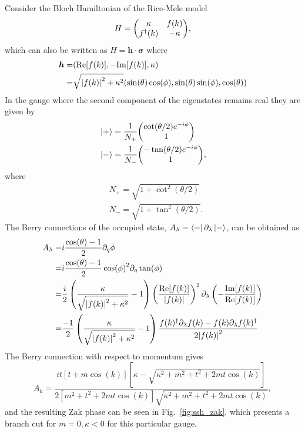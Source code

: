 \documentclass[twocolumn,amsmath,longbibliography,amssymb,superscriptaddress]{revtex4-1}
\begin{document}
Consider the Bloch Hamiltonian of the Rice-Mele model
\begin{equation}
H=\mqty(\kappa & f(k) \\ f^\dagger(k) & -\kappa),
\end{equation}
which can also be written as $H = \boldsymbol{h}\cdot \boldsymbol{\sigma}$
where 
\begin{align*}
\boldsymbol{h}=& ({\rm Re}[f(k)],-{\rm Im}[f(k)],\kappa) \\
=& \sqrt{\abs{f(k)}^2 +\kappa^2}(\sin(\theta)\cos(\phi),\sin(\theta)\sin(\phi),\cos(\theta))
\end{align*}
In the gauge where the second component of the eigenstates remains real they are given by
\begin{align}
&\ket{+}  = \frac{1}{N_+}\mqty(\cot(\theta/2)e^{-i\phi}\\ 1 )\\
&\ket{-}  =\frac{1}{N_-} \mqty(-\tan(\theta/2)e^{-i\phi}\\ 1),
\end{align}
where
\begin{align*}
&N_+ = \sqrt{1+\cot^2(\theta/2)} \\
&N_- = \sqrt{1+\tan^2(\theta/2)} .
\end{align*}
The Berry connections of the occupied state, $A_\lambda = \bra{-}\partial_\lambda \ket{-}$, can be obtained as
\begin{align}
A_{\lambda}=& i\frac{\cos(\theta)-1}{2}\partial_q \phi \\
=&i\frac{\cos(\theta)-1}{2} \cos(\phi)^2 \partial_q  \tan(\phi) \nonumber \\
=&\frac{i}{2}\left(\frac{\kappa}{\sqrt{\abs{f(k)}^2+\kappa^2}}-1\right) \left( \frac{\Re [f(k)]}{\abs{f(k)}}\right)^2 \partial_\lambda  \left( -\frac{\Im [f(k)]}{\Re [f(k)]} \right) \nonumber \\
=&\frac{-1}{2}\left(\frac{\kappa}{\sqrt{\abs{f(k)}^2+\kappa^2}}-1\right) \frac{f(k)^\dagger \partial_\lambda f(k)-f(k)\partial_\lambda f(k)^\dagger}{2\abs{f(k)}^2} \nonumber
\end{align}
The Berry connection with respect to momentum gives
\begin{equation}
A_k = \frac{it [t+m \cos(k)][\kappa - \sqrt{\kappa^2+m^2+t^2+2mt \cos(k)}]}{2[m^2+t^2+2mt\cos(k)]\sqrt{\kappa^2+m^2+t^2+2mt \cos(k)}},
\end{equation}
and the resulting Zak phase can be seen in Fig.~\ref{fig:ssh_zak}, which presents a branch cut for $m=0,\kappa<0$ for this particular gauge.
\end{document}
